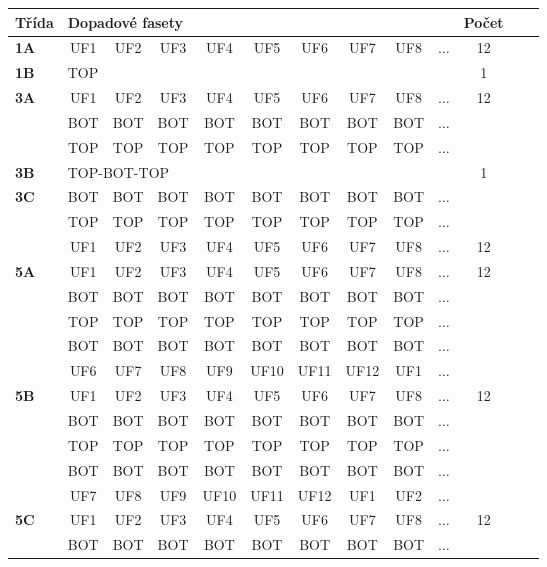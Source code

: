   
\begin{table}[h!]
\centering
\begin{tabular}{|l|c|c|c|c|c|c|c|c|c|c|c|c|}
\hline
Třída &  \multicolumn{9}{l}{Dopadové fasety} \vline  & Počet\\
\hline \hline
\textbf{1A} & UF1 & UF2 & UF3 & UF4 & UF5 & UF6 & UF7 & UF8 & $\dots$ & 12\\
\hline \hline
\textbf{1B} & \multicolumn{9}{l}{TOP} \vline  & 1\\
\hline \hline
\textbf{3A} & UF1 & UF2 & UF3 & UF4 & UF5 & UF6 & UF7 & UF8 & $\dots$ & 12\\
 & BOT & BOT & BOT & BOT & BOT & BOT & BOT & BOT & $\dots$ & \\
 & TOP & TOP & TOP & TOP & TOP & TOP & TOP & TOP & $\dots$ & \\
\hline \hline
\textbf{3B} & \multicolumn{9}{l}{TOP-BOT-TOP} \vline  & 1\\
\hline \hline
\textbf{3C}  & BOT & BOT & BOT & BOT & BOT & BOT & BOT & BOT & $\dots$ & \\
 & TOP & TOP & TOP & TOP & TOP & TOP & TOP & TOP & $\dots$ & \\
 & UF1 & UF2 & UF3 & UF4 & UF5 & UF6 & UF7 & UF8 & $\dots$ & 12\\
\hline \hline
\textbf{5A} & UF1 & UF2 & UF3 & UF4 & UF5 & UF6 & UF7 & UF8 & $\dots$ & 12\\
 & BOT & BOT & BOT & BOT & BOT & BOT & BOT & BOT & $\dots$ & \\
 & TOP & TOP & TOP & TOP & TOP & TOP & TOP & TOP & $\dots$ & \\
 & BOT & BOT & BOT & BOT & BOT & BOT & BOT & BOT & $\dots$ & \\
 & UF6 & UF7 & UF8 & UF9 & UF10 & UF11 & UF12 & UF1 & $\dots$ & \\
\hline \hline
\textbf{5B} & UF1 & UF2 & UF3 & UF4 & UF5 & UF6 & UF7 & UF8 & $\dots$ & 12\\
 & BOT & BOT & BOT & BOT & BOT & BOT & BOT & BOT & $\dots$ & \\
 & TOP & TOP & TOP & TOP & TOP & TOP & TOP & TOP & $\dots$ & \\
 & BOT & BOT & BOT & BOT & BOT & BOT & BOT & BOT & $\dots$ & \\
 & UF7 & UF8 & UF9 & UF10 & UF11 & UF12 & UF1 & UF2 & $\dots$ & \\
\hline \hline
\textbf{5C} & UF1 & UF2 & UF3 & UF4 & UF5 & UF6 & UF7 & UF8 & $\dots$ & 12\\
 & BOT & BOT & BOT & BOT & BOT & BOT & BOT & BOT & $\dots$ & \\

\end{tabular}
\end{table}
